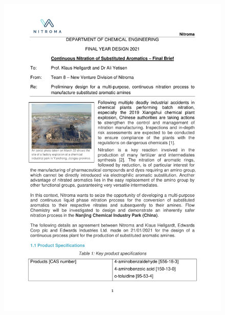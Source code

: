\begin{figure}
    \centering
    \includegraphics[width=\linewidth]{figures/FYD-8_Design-Brief_2021-01-26.pdf}
    \label{fig:my_label}
\end{figure}